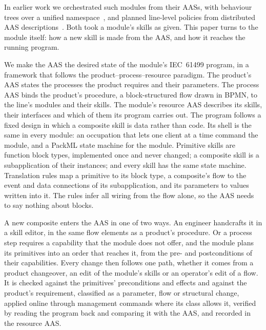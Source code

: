 In earlier work we orchestrated such modules from their AASs, with behaviour trees over a unified
namespace~\cite{jensen2026service}, and planned line-level policies from distributed AAS
descriptions~\cite{schwoerer2026fond}. Both took a module's skills as given. This paper turns to the
module itself: how a new skill is made from the AAS, and how it reaches the running program.

We make the AAS the desired state of the module's IEC~61499 program, in a framework that follows the
product--process--resource paradigm. The product's AAS states the processes the product requires and
their parameters. The process AAS binds the product's procedure, a block-structured flow drawn in
BPMN, to the line's modules and their skills. The module's resource AAS describes its skills, their
interfaces and which of them its program carries out. The program follows a fixed design in which a
composite skill is data rather than code. Its shell is the same in every module: an occupation that
lets one client at a time command the module, and a PackML state machine for the module. Primitive
skills are function block types, implemented once and never changed; a composite skill is a
subapplication of their instances; and every skill has the same state machine. Translation rules map
a primitive to its block type, a composite's flow to the event and data connections of its
subapplication, and its parameters to values written into it. The rules infer all wiring from the
flow alone, so the AAS needs to say nothing about blocks.

A new composite enters the AAS in one of two ways. An engineer handcrafts it in a skill editor, in the
same flow elements as a product's procedure. Or a process step requires a capability that the module
does not offer, and the module plans its primitives into an order that reaches it, from the pre- and
postconditions of their capabilities. Every change then follows one path, whether it comes from a
product changeover, an edit of the module's skills or an operator's edit of a flow. It is checked
against the primitives' preconditions and effects and against the product's requirement, classified
as a parameter, flow or structural change, applied online through management commands where its class
allows it, verified by reading the program back and comparing it with the AAS, and recorded in the
resource AAS.

